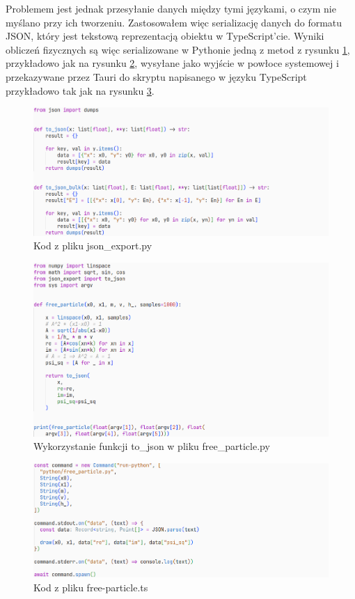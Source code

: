 \documentclass{SGGW-thesis}
\begin{document}
		Problemem jest jednak przesyłanie danych między tymi językami, o czym nie myślano przy ich tworzeniu. Zastosowałem więc serializację danych do formatu JSON, który jest tekstową reprezentacją obiektu w TypeScript'cie. Wyniki obliczeń fizycznych są więc serializowane w Pythonie jedną z metod z rysunku \ref{fig:to-json}, przykładowo jak na rysunku \ref{fig:free-particle-py}, wysyłane jako wyjście w powłoce systemowej i przekazywane przez Tauri do skryptu napisanego w języku TypeScript przykładowo tak jak na rysunku \ref{fig:ts-run-python}.
		
	\begin{figure}[H]
	\includegraphics[width=\textwidth,height=\textheight,keepaspectratio]{to_json.png} 
	\caption{Kod z pliku json\_export.py}
	\label{fig:to-json}
	\end{figure}	
	
	\begin{figure}[H]
	\includegraphics[width=\textwidth,height=\textheight,keepaspectratio]{free_particle py.png} 
	\caption{Wykorzystanie funkcji to\_json w pliku free\_particle.py}
	\label{fig:free-particle-py}
	\end{figure}
	
	\begin{figure}[H]
	\includegraphics[width=\textwidth,height=\textheight,keepaspectratio]{ts run python.png} 
	\caption{Kod z pliku free-particle.ts}	
	\label{fig:ts-run-python}
	\end{figure}
	
\end{document}
